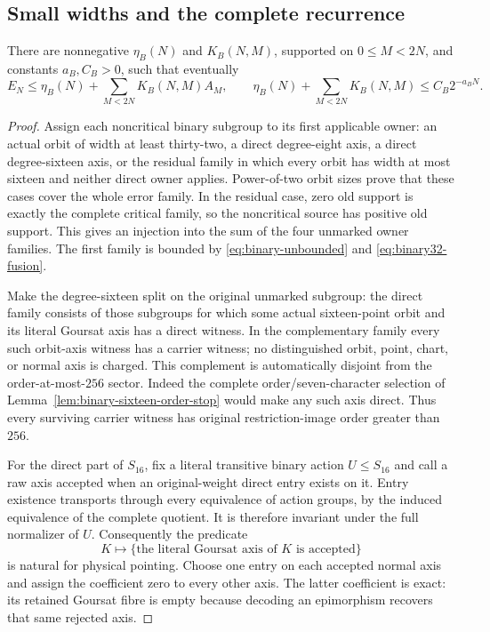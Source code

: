 \subsection{Small widths and the complete recurrence}
\begin{theorem}
\label{thm:binary-recurrence}
There are nonnegative $\eta_B(N)$ and $K_B(N,M)$, supported on
$0\leq M<2N$, and constants $a_B,C_B>0$, such that eventually
\begin{equation}\label{eq:proved-binary-recurrence}
 E_N\leq\eta_B(N)+\sum_{M<2N}K_B(N,M)A_M,\qquad
 \eta_B(N)+\sum_{M<2N}K_B(N,M)\leq C_B2^{-a_BN}.
\end{equation}
\end{theorem}
\begin{proof}
Assign each noncritical binary subgroup to its first applicable owner: an
actual orbit of width at least thirty-two, a direct degree-eight axis, a
direct degree-sixteen axis, or the residual family in which every orbit has
width at most sixteen and neither direct owner applies. Power-of-two orbit
sizes prove that these cases cover the whole error family. In the residual
case, zero old support is exactly the complete critical family, so the
noncritical source has positive old support. This gives an injection into
the sum of the four unmarked owner families. The first family is bounded by
\eqref{eq:binary-unbounded} and \eqref{eq:binary32-fusion}.

Make the degree-sixteen split on the original unmarked subgroup: the direct
family consists of those subgroups for which some actual sixteen-point orbit
and its literal Goursat axis has a direct witness.  In the complementary
family every such orbit-axis witness has a carrier witness; no distinguished
orbit, point, chart, or normal axis is charged.  This complement is
automatically disjoint from the order-at-most-$256$ sector.  Indeed the
complete order/seven-character selection of
Lemma~\ref{lem:binary-sixteen-order-stop} would make any such axis direct.
Thus every surviving carrier witness has original restriction-image order
greater than $256$.

For the direct part of $S_{16}$, fix a literal transitive binary action
$U\leq S_{16}$ and call a raw axis accepted when an original-weight direct
entry exists on it.  Entry existence transports through every equivalence of
action groups, by the induced equivalence of the complete quotient.  It is
therefore invariant under the full normalizer of $U$.  Consequently the
predicate
\[
 K\longmapsto \{\text{the literal Goursat axis of }K\text{ is accepted}\}
\]
is natural for physical pointing.  Choose one entry on each accepted normal
axis and assign the coefficient zero to every other axis.  The latter
coefficient is exact: its retained Goursat fibre is empty because decoding an
epimorphism recovers that same rejected axis.


\end{proof}
